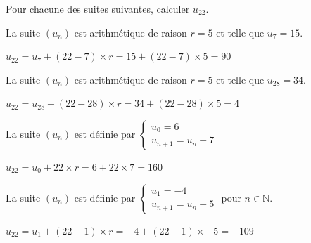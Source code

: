 \documentclass[12pt,a4paper]{article}  %
\begin{document}
Pour chacune des suites suivantes, calculer $u_{22}$.
\begin{enumMet}
    \item La suite $\left(u_{n}\right)$ est arithmétique de raison $r=5$ et telle que $u_{7}=15$.\\
    \begin{corrBox}
        $u_{22}=u_{7}+(22-7)\times r=15+(22-7)\times 5=90$
    \end{corrBox}
    \item La suite $\left(u_{n}\right)$ est arithmétique de raison $r=5$ et telle que $u_{28}=34$.\\
    \begin{corrBox}
        $u_{22}=u_{28}+(22-28)\times r=34+(22-28)\times 5=4$
    \end{corrBox}
    \item La suite $\left(u_{n}\right)$ est définie par $\left\{\begin{array}{l}u_{0}=6 \\ u_{n+1}=u_{n}+7\end{array}\right.$\\
    \begin{corrBox}
        $u_{22}=u_{0}+22\times r=6+22\times 7=160$
    \end{corrBox}
    \item {} La suite $\left(u_{n}\right)$ est définie par $\left\{\begin{array}{l}u_{1}=-4 \\ u_{n+1}=u_{n}-5\end{array}\right.$ pour $n \in \mathbb{N}$.\\
    \begin{corrBox}
        $u_{22}=u_{1}+(22-1)\times r=-4+(22-1)\times -5=-109$
    \end{corrBox}
\end{enumMet}
\end{document}
